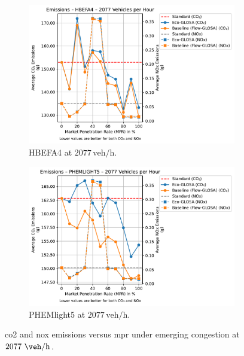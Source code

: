 \begin{figure}[htb]
  \centering
  \begin{subfigure}[b]{0.45\textwidth}
    \includegraphics[width=\textwidth]{data/img/Emissions/Emissions_HBEFA4_Cars2077.pdf}
    \caption{HBEFA4 at $2077\,\mathrm{veh/h}$.}
    \label{fig:Emis_2077_HBEFA4}
  \end{subfigure}\hfill
  \begin{subfigure}[b]{0.45\textwidth}
    \includegraphics[width=\textwidth]{data/img/Emissions/Emissions_PHEMLIGHT5_Cars2077.pdf}
    \caption{PHEMlight5 at $2077\,\mathrm{veh/h}$.}
    \label{fig:Emis_2077_PHEM}
  \end{subfigure}
  \caption[\ac{co2} and \ac{nox} emissions vs. \ac{mpr} at $2077~\unit{\veh\per\hour}$]{\ac{co2} and \ac{nox} emissions versus \ac{mpr} under emerging congestion at $2077~\unit{\veh\per\hour}$.}
  \label{fig:Emis_2077}
\end{figure}

